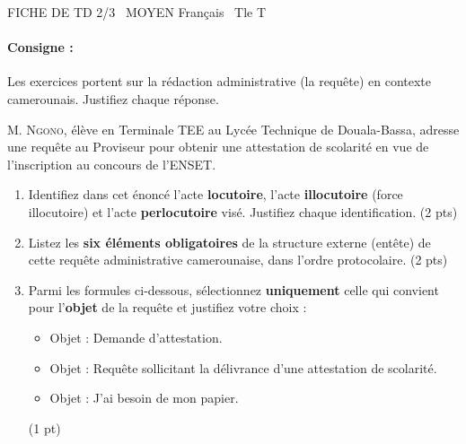 \documentclass[11pt]{article}
\begin{document}
\begin{tcolorbox}[enhanced,colback=popink,colframe=popink,arc=10pt,boxrule=0pt,left=12pt,right=12pt,top=9pt,bottom=9pt]
{\color{white}\popxbold\small FICHE DE TD 2/3 \textbullet\ MOYEN \hfill Français \textbullet\ Tle T\par}
\end{tcolorbox}
\vspace{4pt}
\paragraph{Consigne :} Les exercices portent sur la rédaction administrative (la requête) en contexte camerounais. Justifiez chaque réponse.

\begin{exercice}
M. \textsc{Ngono}, élève en Terminale TEE au Lycée Technique de Douala-Bassa, adresse une requête au Proviseur pour obtenir une attestation de scolarité en vue de l'inscription au concours de l'ENSET.
\begin{enumerate}
    \item Identifiez dans cet énoncé l'acte \textbf{locutoire}, l'acte \textbf{illocutoire} (force illocutoire) et l'acte \textbf{perlocutoire} visé. Justifiez chaque identification. (2 pts)
    \item Listez les \textbf{six éléments obligatoires} de la structure externe (entête) de cette requête administrative camerounaise, dans l'ordre protocolaire. (2 pts)
    \item Parmi les formules ci-dessous, sélectionnez \textbf{uniquement} celle qui convient pour l'\textbf{objet} de la requête et justifiez votre choix : 
    \begin{itemize}
        \item[a)] Objet : Demande d'attestation.
        \item[b)] Objet : Requête sollicitant la délivrance d'une attestation de scolarité.
        \item[c)] Objet : J'ai besoin de mon papier.
    \end{itemize} (1 pt)
\end{enumerate}
\end{exercice}
\end{document}
